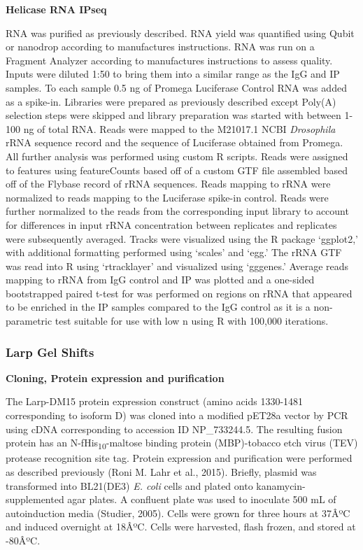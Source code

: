 \documentclass[12pt,oneside]{reedthesis}
\begin{document}
\textbf{Helicase RNA IPseq}

RNA was purified as previously described. RNA yield was quantified using Qubit or nanodrop according to manufactures instructions. RNA was run on a Fragment Analyzer according to manufactures instructions to assess quality. Inputs were diluted 1:50 to bring them into a similar range as the IgG and IP samples. To each sample 0.5 ng of Promega Luciferase Control RNA was added as a spike-in. Libraries were prepared as previously described except Poly(A) selection steps were skipped and library preparation was started with between 1-100 ng of total RNA. Reads were mapped to the M21017.1 NCBI \emph{Drosophila} rRNA sequence record and the sequence of Luciferase obtained from Promega. All further analysis was performed using custom R scripts. Reads were assigned to features using featureCounts based off of a custom GTF file assembled based off of the Flybase record of rRNA sequences. Reads mapping to rRNA were normalized to reads mapping to the Luciferase spike-in control. Reads were further normalized to the reads from the corresponding input library to account for differences in input rRNA concentration between replicates and replicates were subsequently averaged. Tracks were visualized using the R package `ggplot2,' with additional formatting performed using `scales' and `egg.' The rRNA GTF was read into R using `rtracklayer' and visualized using `gggenes.' Average reads mapping to rRNA from IgG control and IP was plotted and a one-sided bootstrapped paired t-test for was performed on regions on rRNA that appeared to be enriched in the IP samples compared to the IgG control as it is a non-parametric test suitable for use with low n using R with 100,000 iterations.

\hypertarget{larp-gel-shifts}{%
\subsubsection{Larp Gel Shifts}\label{larp-gel-shifts}}

\textbf{Cloning, Protein expression and purification}

The Larp-DM15 protein expression construct (amino acids 1330-1481 corresponding to isoform D) was cloned into a modified pET28a vector by PCR using cDNA corresponding to accession ID NP\_733244.5. The resulting fusion protein has an N-fHis\textsubscript{10}-maltose binding protein (MBP)-tobacco etch virus (TEV) protease recognition site tag. Protein expression and purification were performed as described previously (Roni M. Lahr et al., 2015). Briefly, plasmid was transformed into BL21(DE3) \emph{E. coli} cells and plated onto kanamycin-supplemented agar plates. A confluent plate was used to inoculate 500 mL of autoinduction media (Studier, 2005). Cells were grown for three hours at 37ÂºC and induced overnight at 18ÂºC. Cells were harvested, flash frozen, and stored at -80ÂºC.
\end{document}
